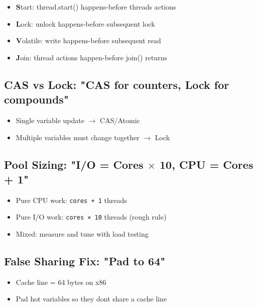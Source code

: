 \documentclass[11pt]{article}
\providecommand{\tightlist}{\setlength{\itemsep}{1pt}\setlength{\parskip}{0pt}}
\begin{document}
\begin{itemize}
\tightlist
\item
  \textbf{S}tart: thread.start() happens-before thread\textquotesingle s actions
\item
  \textbf{L}ock: unlock happens-before subsequent lock
\item
  \textbf{V}olatile: write happens-before subsequent read
\item
  \textbf{J}oin: thread actions happen-before join() returns
\end{itemize}

\subsection{\texorpdfstring{CAS vs Lock: \textbf{"CAS for counters, Lock for compounds"}}{CAS vs Lock: "CAS for counters, Lock for compounds"}}\label{cas-vs-lock-cas-for-counters-lock-for-compounds}

\begin{itemize}
\tightlist
\item
  Single variable update \(\rightarrow\) CAS/Atomic
\item
  Multiple variables must change together \(\rightarrow\) Lock
\end{itemize}

\subsection{\texorpdfstring{Pool Sizing: \textbf{"I/O = Cores \(\times\) 10, CPU = Cores + 1"}}{Pool Sizing: "I/O = Cores \textbackslash times 10, CPU = Cores + 1"}}\label{pool-sizing-io--cores-times-10-cpu--cores--1}

\begin{itemize}
\tightlist
\item
  Pure CPU work: \texttt{cores\ +\ 1} threads
\item
  Pure I/O work: \texttt{cores\ ×\ 10} threads (rough rule)
\item
  Mixed: measure and tune with load testing
\end{itemize}

\subsection{\texorpdfstring{False Sharing Fix: \textbf{"Pad to 64"}}{False Sharing Fix: "Pad to 64"}}\label{false-sharing-fix-pad-to-64}

\begin{itemize}
\tightlist
\item
  Cache line = 64 bytes on x86
\item
  Pad hot variables so they don\textquotesingle t share a cache line
\end{itemize}
\end{document}
